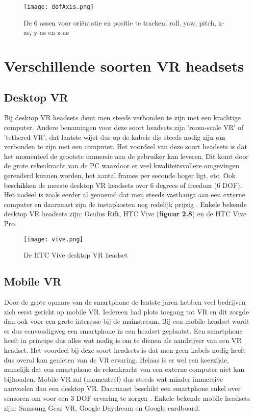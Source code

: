 \begin{figure}[h]
    \centering
    \texttt{[image: dofAxis.png]}
    \caption{De 6 assen voor oriëntatie en positie te tracken: roll, yaw, pitch, x-as, y-as en z-as \autocite{Weis2018}}
\end{figure}

\pagebreak

\section{Verschillende soorten VR headsets}

\subsection{Desktop VR}
Bij desktop VR headsets dient men steeds verbonden te zijn met een krachtige computer. Andere benamingen voor deze soort headsets zijn 'room-scale VR' of 'tethered VR', dat laatste wijst dus op de kabels die steeds nodig zijn om verbonden te zijn met een computer. Het voordeel van deze soort headsets is dat het momenteel de grootste immersie aan de gebruiker kan leveren. Dit komt door de grote rekenkracht van de PC waardoor er veel kwaliteitsvollere omgevingen gerenderd kunnen worden, het aantal frames per seconde hoger ligt, etc. Ook beschikken de meeste desktop VR headsets over 6 degrees of freedom (6 DOF). Het nadeel is zoals eerder al genoemd dat men steeds vasthangt aan een externe computer en daarnaast zijn de instapkosten nog redelijk prijzig \autocite{Cherdo2018}. Enkele bekende desktop VR headsets zijn: Oculus Rift, HTC Vive (\textbf{figuur 2.8}) en de HTC Vive Pro.

\begin{figure}[h]
    \centering
    \texttt{[image: vive.png]}
    \caption{De HTC Vive desktop VR headset \autocite{Vive2019}}
\end{figure}


\subsection{Mobile VR}
Door de grote opmars van de smartphone de laatste jaren hebben veel bedrijven zich eerst gericht op mobile VR. Iedereen had plots toegang tot VR en dit zorgde dan ook voor een grote interesse bij de mainstream. Bij een mobile headset wordt er dus eenvoudigweg een smartphone in een headset geplaatst.
Een smartphone heeft in principe dus alles wat nodig is om te dienen als aandrijver van een VR headset. Het voordeel bij deze soort headsets is dat men geen kabels nodig heeft dus overal kan genieten van de VR ervaring. Helaas is er wel een keerzijde, namelijk dat een smartphone de rekenkracht van een externe computer niet kan bijhouden. Mobile VR zal (momenteel) dus steeds wat minder immersive aanvoelen dan een desktop VR. Daarnaast beschikt een smartphone enkel over sensoren om voor een 3 DOF ervaring te zorgen \autocite{Cherdo2018}.
Enkele bekende mobile headsets zijn: Samsung Gear VR, Google Daydream en Google cardboard.

